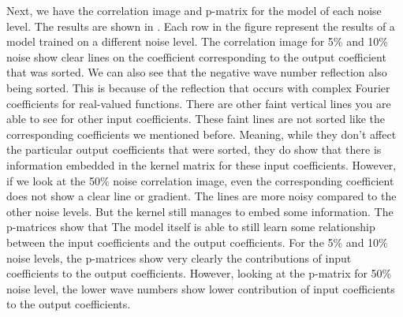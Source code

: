 Next, we have the correlation image and p-matrix for the model of each noise level. The results are shown in . Each row in the figure represent the results of a model trained on a different noise level. The correlation image for 5\% and 10\% noise show clear lines on the coefficient corresponding to the output coefficient that was sorted. We can also see that the negative wave number reflection also being sorted. This is because of the reflection that occurs with complex Fourier coefficients for real-valued functions. There are other faint vertical lines you are able to see for other input coefficients. These faint lines are not sorted like the corresponding coefficients we mentioned before. Meaning, while they don't affect the particular output coefficients that were sorted, they do show that there is information embedded in the kernel matrix for these input coefficients. However, if we look at the 50\% noise correlation image, even the corresponding coefficient does not show a clear line or gradient. The lines are more noisy compared to the other noise levels. But the kernel still manages to embed some information. The p-matrices show that The model itself is able to still learn some relationship between the input coefficients and the output coefficients. For the 5\% and 10\% noise levels, the p-matrices show very clearly the contributions of input coefficients to the output coefficients. However, looking at the p-matrix for 50\% noise level, the lower wave numbers show lower contribution of input coefficients to the output coefficients.
